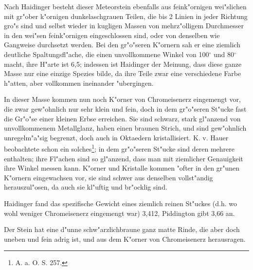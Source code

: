 \documentclass[a4paper, 11pt, oneside]{article}
\begin{document}
Nach Haidinger besteht dieser Meteorstein ebenfalls aus feink"ornigen wei"slichen mit gr"ober k"ornigen dunkelaschgrauen Teilen, die bis 2 Linien in jeder Richtung gro"s sind und selbst wieder in kugligen Massen von mehrz"olligem Durchmesser in den wei"sen feink"ornigen eingeschlossen sind, oder von denselben wie Gangweise durchsetzt werden. Bei den gr"o"seren K"ornern sah er eine ziemlich deutliche Spaltungsfl"ache, die einen unvollkommene Winkel von 100$^{\circ}$ und 80$^{\circ}$ macht, ihre H"arte ist 6,5; indessen ist Haidinger der Meinung, dass diese ganze Masse nur eine einzige Spezies bilde, da ihre Teile zwar eine verschiedene Farbe h"atten, aber vollkommen ineinander "ubergingen.

In dieser Masse kommen nun noch K"orner von Chromeisenerz eingemengt vor, die zwar gew"ohnlich nur sehr klein und fein, doch in dem gr"o"seren St"ucke fast die Gr"o"se einer kleinen Erbse erreichen. Sie sind schwarz, stark gl"anzend von unvollkommenem Metallglanz, haben einen braunen Strich, und sind gew"ohnlich unregelm"a"sig begrenzt, doch auch in Oktaedern kristallisiert. K. v. Hauer beobachtete schon ein solches\footnote{A. a. O. S. 257.}; in dem gr"o"seren St"ucke sind deren mehrere enthalten; ihre Fl"achen sind so gl"anzend, dass man mit ziemlicher Genauigkeit ihre Winkel messen kann. K"orner und Kristalle kommen "ofter in den gr"unen K"ornern eingewachsen vor, sie sind schwer aus denselben vollst"andig herauszul"osen, da auch sie kl"uftig und br"ocklig sind.

Haidinger fand das spezifische Gewicht eines ziemlich reinen St"uckes (d.h. wo wohl weniger Chromeisenerz eingemengt war) 3,412, Piddington gibt 3,66 an.

Der Stein hat eine d"unne schw"arzlichbraune ganz matte Rinde, die aber doch uneben und fein adrig ist, und aus dem K"orner von Chromeisenerz herausragen.
\end{document}
